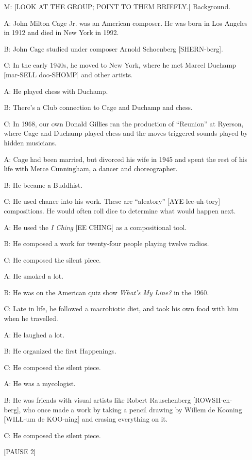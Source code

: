 \documentclass[17pt]{extarticle}
\begin{document}
M:  [LOOK AT THE GROUP; POINT TO THEM BRIEFLY.] Background.

A:  John Milton Cage Jr. was an American composer.  He was born in Los Angeles in 1912 and died in New York in 1992.

B:  John Cage studied under composer Arnold Schoenberg [SHERN-berg].

C:  In the early 1940s, he moved to New York, where he met Marcel Duchamp [mar-SELL doo-SHOMP] and other artists.

A:  He played chess with Duchamp.

B:  There's a Club connection to Cage and Duchamp and chess.

C:  In 1968, our own Donald Gillies ran the production of ``Reunion'' at Ryerson, where Cage and Duchamp played chess and the moves triggered sounds played by hidden musicians.

A:  Cage had been married, but divorced his wife in 1945 and spent the rest of his life with Merce Cunningham, a dancer and choreographer.

B:  He became a Buddhist.

C:  He used chance into his work.  These are ``aleatory'' [AYE-lee-uh-tory] compositions.  He would often roll dice to determine what would happen next.

A:  He used the \textit{I Ching} [EE CHING] as a compositional tool.

B:  He composed a work for twenty-four people playing twelve radios.

C:  He composed the silent piece.

A:  He smoked a lot.

B:  He was on the American quiz show \textit{What's My Line?} in the 1960.

C:  Late in life, he followed a macrobiotic diet, and took his own food with him when he travelled.

A:  He laughed a lot.

B:  He organized the first Happenings.

C:  He composed the silent piece.

A:  He was a mycologist.

B:  He was friends with visual artists like Robert Rauschenberg [ROWSH-en-berg], who once made a work by taking a pencil drawing by Willem de Kooning [WILL-um de KOO-ning] and erasing everything on it.

C: He composed the silent piece.

[PAUSE 2]
\end{document}
